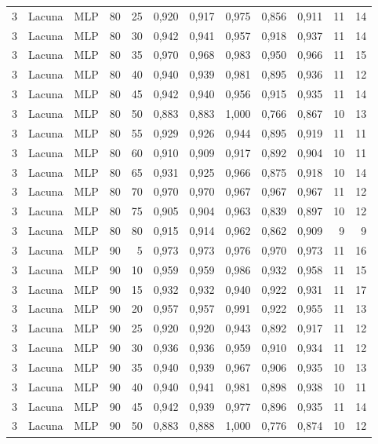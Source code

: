 \begin{longtable}{ccclrrrrrrrr}
3 & Lacuna & MLP & 80 & 25 & 0,920 & 0,917 & 0,975 & 0,856 & 0,911 & 11 & 14 \\
3 & Lacuna & MLP & 80 & 30 & 0,942 & 0,941 & 0,957 & 0,918 & 0,937 & 11 & 14 \\
3 & Lacuna & MLP & 80 & 35 & 0,970 & 0,968 & 0,983 & 0,950 & 0,966 & 11 & 15 \\
3 & Lacuna & MLP & 80 & 40 & 0,940 & 0,939 & 0,981 & 0,895 & 0,936 & 11 & 12 \\
3 & Lacuna & MLP & 80 & 45 & 0,942 & 0,940 & 0,956 & 0,915 & 0,935 & 11 & 14 \\
3 & Lacuna & MLP & 80 & 50 & 0,883 & 0,883 & 1,000 & 0,766 & 0,867 & 10 & 13 \\
3 & Lacuna & MLP & 80 & 55 & 0,929 & 0,926 & 0,944 & 0,895 & 0,919 & 11 & 11 \\
3 & Lacuna & MLP & 80 & 60 & 0,910 & 0,909 & 0,917 & 0,892 & 0,904 & 10 & 11 \\
3 & Lacuna & MLP & 80 & 65 & 0,931 & 0,925 & 0,966 & 0,875 & 0,918 & 10 & 14 \\
3 & Lacuna & MLP & 80 & 70 & 0,970 & 0,970 & 0,967 & 0,967 & 0,967 & 11 & 12 \\
3 & Lacuna & MLP & 80 & 75 & 0,905 & 0,904 & 0,963 & 0,839 & 0,897 & 10 & 12 \\
3 & Lacuna & MLP & 80 & 80 & 0,915 & 0,914 & 0,962 & 0,862 & 0,909 & 9 & 9 \\
3 & Lacuna & MLP & 90 & 5 & 0,973 & 0,973 & 0,976 & 0,970 & 0,973 & 11 & 16 \\
3 & Lacuna & MLP & 90 & 10 & 0,959 & 0,959 & 0,986 & 0,932 & 0,958 & 11 & 15 \\
3 & Lacuna & MLP & 90 & 15 & 0,932 & 0,932 & 0,940 & 0,922 & 0,931 & 11 & 17 \\
3 & Lacuna & MLP & 90 & 20 & 0,957 & 0,957 & 0,991 & 0,922 & 0,955 & 11 & 13 \\
3 & Lacuna & MLP & 90 & 25 & 0,920 & 0,920 & 0,943 & 0,892 & 0,917 & 11 & 12 \\
3 & Lacuna & MLP & 90 & 30 & 0,936 & 0,936 & 0,959 & 0,910 & 0,934 & 11 & 12 \\
3 & Lacuna & MLP & 90 & 35 & 0,940 & 0,939 & 0,967 & 0,906 & 0,935 & 10 & 13 \\
3 & Lacuna & MLP & 90 & 40 & 0,940 & 0,941 & 0,981 & 0,898 & 0,938 & 10 & 11 \\
3 & Lacuna & MLP & 90 & 45 & 0,942 & 0,939 & 0,977 & 0,896 & 0,935 & 11 & 14 \\
3 & Lacuna & MLP & 90 & 50 & 0,883 & 0,888 & 1,000 & 0,776 & 0,874 & 10 & 12 \\

\end{longtable}
